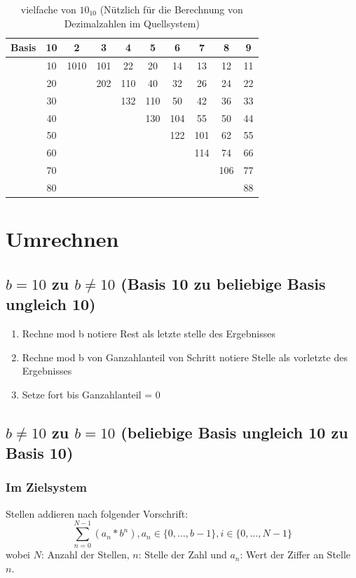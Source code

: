 \documentclass[a4paper]{article}
\begin{document}
	\begin{table}[H]
	\centering
	\caption{vielfache von $10_{10}$ (Nützlich für die Berechnung von Dezimalzahlen im Quellsystem)}
	\label{vielfacheVon10}
	\begin{tabular}{cc|c|c|c|c|c|c|c|c}
	Basis &10    & 2    & 3   & 4   & 5   & 6   & 7   & 8   & 9  \\\hline
	      &10    & 1010 & 101 & 22  & 20  & 14  & 13  & 12  & 11 \\\hline
	      &20    &      & 202 & 110 & 40  & 32  & 26  & 24  & 22 \\\hline
	      &30    &      &     & 132 & 110 & 50  & 42  & 36  & 33 \\\hline
	      &40    &      &     &     & 130 & 104 & 55  & 50  & 44 \\\hline
	      &50    &      &     &     &     & 122 & 101 & 62  & 55 \\\hline
	      &60    &      &     &     &     &     & 114 & 74  & 66 \\\hline
	      &70    &      &     &     &     &     &     & 106 & 77 \\\hline
	      &80    &      &     &     &     &     &     &     & 88
	\end{tabular}
	\end{table}

\section{Umrechnen}
	\subsection{\texorpdfstring{$b = 10$ zu $b \neq 10$ (Basis 10 zu beliebige Basis ungleich 10)}{Basis 10 zu b-adisch ungleich 10}}
		\begin{enumerate}
			\item Rechne mod b notiere Rest als letzte stelle des Ergebnisses
			\item Rechne mod b von Ganzahlanteil von Schritt notiere Stelle als vorletzte des Ergebnisses
			\item Setze fort bis Ganzahlanteil = 0
		\end{enumerate}
	\subsection{\texorpdfstring{$b \neq 10$ zu $b = 10$ (beliebige Basis ungleich 10 zu Basis 10)}{b-adisch ungleich 10 zu Basis 10}}
		\subsubsection{Im Zielsystem}
			Stellen addieren nach folgender Vorschrift:
			\[
			 \sum \limits_{n=0}^{N-1} (a_n * b^{n}), a_n \in \{0, \ldots , b-1\}, i \in \{0, \ldots ,N-1\}
			\]
			wobei $N$: Anzahl der Stellen, $n$: Stelle der Zahl und $a_n$: Wert der Ziffer an Stelle $n$.
			
\end{document}
